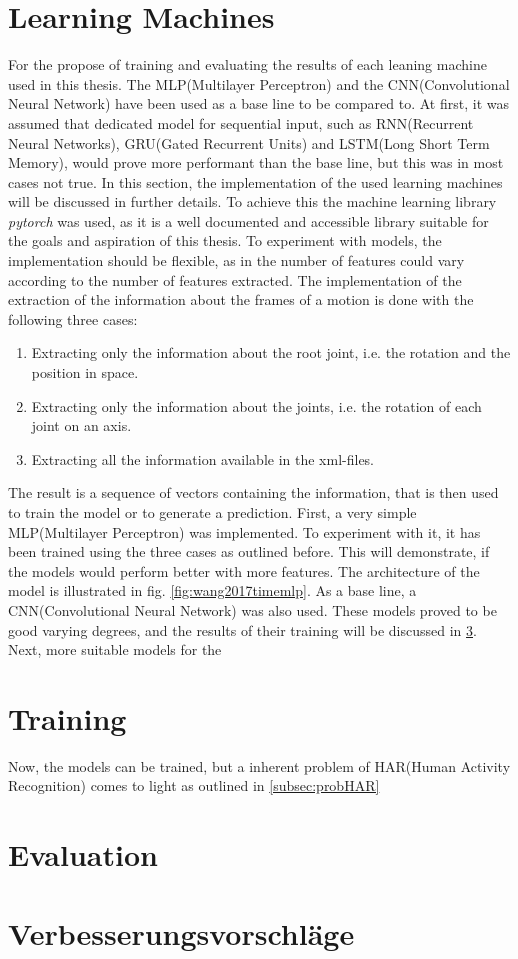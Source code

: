 	\section{Learning Machines}
		\label{section:learningmachines}
		For the propose of training and evaluating the results of each leaning machine used in this thesis. The MLP(Multilayer Perceptron) and the CNN(Convolutional Neural Network) have been used as a base line to be compared to. At first, it was assumed that dedicated model for sequential input, such as RNN(Recurrent Neural Networks), GRU(Gated Recurrent Units) and LSTM(Long Short Term Memory), would prove more performant than the base line, but this was in most cases not true. In this section, the implementation of the used learning machines will be discussed in further details. To achieve this the machine learning library \textit{pytorch} was used, as it is a well documented and accessible library suitable for the goals and aspiration of this thesis. To experiment with models, the implementation should be flexible, as in the number of features could vary according to the number of features extracted. The implementation of the extraction of the information about the frames of a motion is done with the following three cases:
		\begin{enumerate}
			\item Extracting only the information about the root joint, i.e. the rotation and the position in space.
			\item Extracting only the information about the joints, i.e. the rotation of each joint on an axis.
			\item Extracting all the information available in the xml-files.
		\end{enumerate}
		The result is a sequence of vectors containing the information, that is then used to train the model or to generate a prediction.\newline
		First, a very simple MLP(Multilayer Perceptron) was implemented. To experiment with it, it has been trained using the three cases as outlined before. This will demonstrate, if the models would perform better with more features. The architecture of the model is illustrated in fig. \ref{fig:wang2017timemlp}. As a base line, a CNN(Convolutional Neural Network) was also used. These models proved to be good varying degrees, and the results of their training will be discussed in \ref{sec:evaluation}. Next, more suitable models for the 
	\section{Training}\label{section:training}
		Now, the models can be trained, but a inherent problem of HAR(Human Activity Recognition) comes to light as outlined in \ref{subsec:probHAR}
	\section{Evaluation}\label{sec:evaluation}
	\section{Verbesserungsvorschläge}

